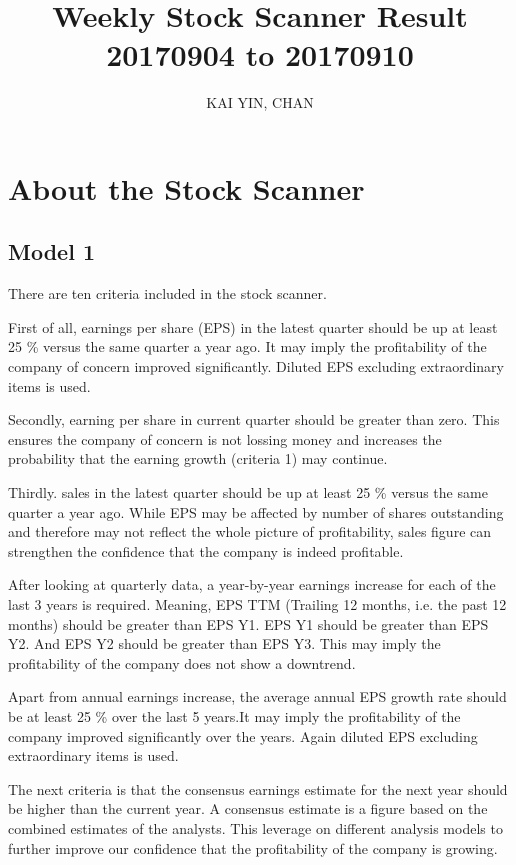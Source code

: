 \documentclass{article}
\begin{document}
\title{Weekly Stock Scanner Result \\ 20170904 to 20170910}
\author{KAI YIN, CHAN}
\maketitle

\section{About the Stock Scanner}
\subsection{Model 1}
There are ten criteria included in the stock scanner. 

First of all, earnings per share (EPS) in the latest quarter should be up at least 25 \% versus the same quarter a year ago. It may imply the profitability of the company of concern improved significantly. Diluted EPS excluding extraordinary items is used.

Secondly, earning per share in current quarter should be greater than zero. This ensures the company of concern is not lossing money and increases the probability that the earning growth (criteria 1) may continue.

Thirdly. sales in the latest quarter should be up at least 25 \% versus the same quarter a year ago. While EPS may be affected by number of shares outstanding and therefore may not reflect the whole picture of profitability, sales figure can strengthen the confidence that the company is indeed profitable.

After looking at quarterly data, a year-by-year earnings increase for each of the last 3 years is required. Meaning, EPS TTM (Trailing 12 months, i.e. the past 12 months) should be greater than EPS Y1. EPS Y1 should be greater than EPS Y2. And EPS Y2 should be greater than EPS Y3. This may imply the profitability of the company does not show a downtrend.

Apart from annual earnings increase, the average annual EPS growth rate should be at least 25 \% over the last 5 years.It may imply the profitability of the company improved significantly over the years. Again diluted EPS excluding extraordinary items is used.

The next criteria is that the consensus earnings estimate for the next year should be higher than the current year. A consensus estimate is a figure based on the combined estimates of the analysts. This leverage on different analysis models to further improve our confidence that the profitability of the company is growing.
\end{document}
